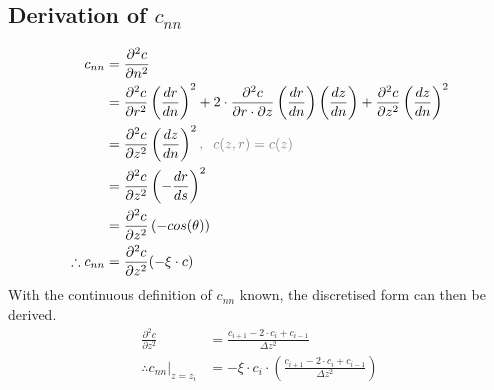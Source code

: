 \documentclass{article}
\begin{document}
\subsection{Derivation of $c_{nn}$}
\begin{align*}
  c_{nn} &= \frac{\partial^2 c}{\partial n^2}\\
         &=\frac{\partial ^2 c}{\partial r^2}\left(\frac{dr}{dn}\right)^2 + 2\cdot\frac{\partial^2 c}{\partial r\cdot \partial z}\left(\frac{dr}{dn}\right)\left(\frac{dz}{dn}\right) + \frac{\partial ^2 c}{\partial z^2 }\left(\frac{dz}{dn}\right)^2\\
         &=\frac{\partial^2 c}{\partial z^2}\left(\frac{dz}{dn}\right)^2\textcolor{gray}{,\;\;c(z, r)=c(z)}\\
         &=\frac{\partial ^2c}{\partial z^2}\left(-\frac{dr}{ds}\right)^2\\
         &=\frac{\partial^2c}{\partial z^2}\left(-cos(\theta)\right)\\
  \therefore c_{nn} &= \frac{\partial^2 c}{\partial z^2}(-\xi\cdot c)
\end{align*}
With the continuous definition of $c_{nn}$ known, the discretised form can then be derived.
\begin{align*}
  \frac{\partial^2 c}{\partial z^2} &= \frac{c_{i+1}-2\cdot c_i + c_{i-1}}{\Delta z^2}\\
  \therefore \left.c_{nn}\right|_{z=z_i} &= -\xi\cdot c_i\cdot\left(\frac{c_{i+1}-2\cdot c_i + c_{i-1}}{\Delta z^2}\right)
\end{align*}
\end{document}
